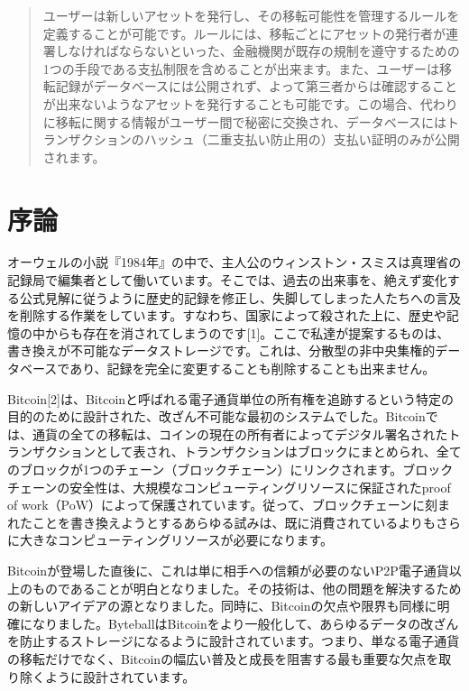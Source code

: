 \documentclass[a4paper, dvipdfmx]{jsarticle}
\begin{document}
\begin{abstract}
ユーザーは新しいアセットを発行し、その移転可能性を管理するルールを定義することが可能です。ルールには、移転ごとにアセットの発行者が連署しなければならないといった、金融機関が既存の規制を遵守するための1つの手段である支払制限を含めることが出来ます。また、ユーザーは移転記録がデータベースには公開されず、よって第三者からは確認することが出来ないようなアセットを発行することも可能です。この場合、代わりに移転に関する情報がユーザー間で秘密に交換され、データベースにはトランザクションのハッシュ（二重支払い防止用の）支払い証明のみが公開されます。
\end{abstract}

\newpage
\section{序論}
オーウェルの小説『1984年』の中で、主人公のウィンストン・スミスは真理省の記録局で編集者として働いています。そこでは、過去の出来事を、絶えず変化する公式見解に従うように歴史的記録を修正し、失脚してしまった人たちへの言及を削除する作業をしています。すなわち、国家によって殺された上に、歴史や記憶の中からも存在を消されてしまうのです[1]。ここで私達が提案するものは、書き換えが不可能なデータストレージです。これは、分散型の非中央集権的データベースであり、記録を完全に変更することも削除することも出来ません。

Bitcoin[2]は、Bitcoinと呼ばれる電子通貨単位の所有権を追跡するという特定の目的のために設計された、改ざん不可能な最初のシステムでした。Bitcoinでは、通貨の全ての移転は、コインの現在の所有者によってデジタル署名されたトランザクションとして表され、トランザクションはブロックにまとめられ、全てのブロックが1つのチェーン（ブロックチェーン）にリンクされます。ブロックチェーンの安全性は、大規模なコンピューティングリソースに保証されたproof of work（PoW）によって保護されています。従って、ブロックチェーンに刻まれたことを書き換えようとするあらゆる試みは、既に消費されているよりもさらに大きなコンピューティングリソースが必要になります。

Bitcoinが登場した直後に、これは単に相手への信頼が必要のないP2P電子通貨以上のものであることが明白となりました。その技術は、他の問題を解決するための新しいアイデアの源となりました。同時に、Bitcoinの欠点や限界も同様に明確になりました。ByteballはBitcoinをより一般化して、あらゆるデータの改ざんを防止するストレージになるように設計されています。つまり、単なる電子通貨の移転だけでなく、Bitcoinの幅広い普及と成長を阻害する最も重要な欠点を取り除くように設計されています。
\end{document}
